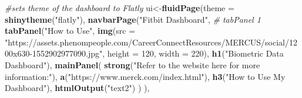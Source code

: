 \documentclass[]{book}
\newenvironment{Shaded}{\begin{snugshade}}{\end{snugshade}}
\newcommand{\KeywordTok}[1]{\textcolor[rgb]{0.13,0.29,0.53}{\textbf{#1}}}
\newcommand{\DataTypeTok}[1]{\textcolor[rgb]{0.13,0.29,0.53}{#1}}
\newcommand{\DecValTok}[1]{\textcolor[rgb]{0.00,0.00,0.81}{#1}}
\newcommand{\StringTok}[1]{\textcolor[rgb]{0.31,0.60,0.02}{#1}}
\newcommand{\CommentTok}[1]{\textcolor[rgb]{0.56,0.35,0.01}{\textit{#1}}}
\newcommand{\NormalTok}[1]{#1}
\begin{document}
\begin{Shaded}
\begin{Highlighting}[]
{{\CommentTok{#sets theme of the dashboard to Flatly}
\NormalTok{ui<-}\KeywordTok{fluidPage}\NormalTok{(}\DataTypeTok{theme =} \KeywordTok{shinytheme}\NormalTok{(}\StringTok{"flatly"}\NormalTok{),}
              \KeywordTok{navbarPage}\NormalTok{(}\StringTok{"Fitbit Dashboard"}\NormalTok{,}
                         \CommentTok{# tabPanel 1}
                         \KeywordTok{tabPanel}\NormalTok{(}\StringTok{"How to Use"}\NormalTok{,}
                                  \KeywordTok{img}\NormalTok{(}\DataTypeTok{src =} \StringTok{"https://assets.phenompeople.com/CareerConnectResources/MERCUS/social/1200x630-1552902977090.jpg"}\NormalTok{, }\DataTypeTok{height =} \DecValTok{120}\NormalTok{, }\DataTypeTok{width =} \DecValTok{220}\NormalTok{),}
                                  \KeywordTok{h1}\NormalTok{(}\StringTok{"Biometric Data Dashboard"}\NormalTok{),}
                                  \KeywordTok{mainPanel}\NormalTok{(}
                                    \KeywordTok{strong}\NormalTok{(}\StringTok{"Refer to the website here for more information:"}\NormalTok{),}
                                    \KeywordTok{a}\NormalTok{(}\StringTok{"https://www.merck.com/index.html"}\NormalTok{),}
                                    \KeywordTok{h3}\NormalTok{(}\StringTok{"How to Use My Dashboard"}\NormalTok{),}
                                    \KeywordTok{htmlOutput}\NormalTok{(}\StringTok{"text2"}\NormalTok{)}
\NormalTok{                                  )                      }
\NormalTok{                         ), }
                         
}}
\end{Highlighting}
\end{Shaded}
\end{document}
